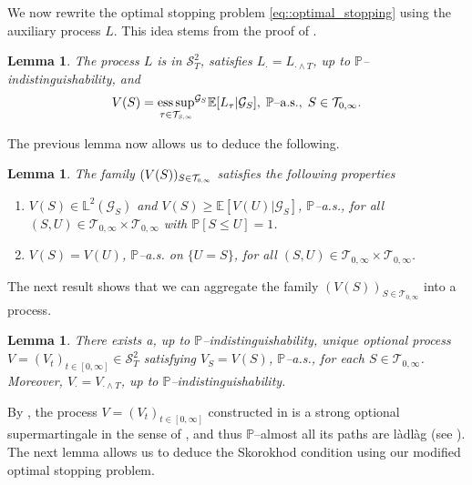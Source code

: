 \documentclass[10pt]{article} %
\newtheorem{lemma}[theorem]{Lemma}
\newcommand\cG{\mathcal G}
\newcommand\cS{\mathcal S}
\newcommand\cT{\mathcal T}
\newcommand{\smalltext}[1]{\text{\fontsize{4}{4}\selectfont$#1$}}
\def \E{\mathbb{E}}
\def \L{\mathbb{L}}
\def \P{\mathbb{P}}
\DeclareMathOperator*{\esssup}{ess\,sup}
\begin{document}
We now rewrite the optimal stopping problem \eqref{eq::optimal_stopping} using the auxiliary process $L$. This idea stems from the proof of \cite[Proposition 6.3.2]{zhang2017backward}.
	
	
\begin{lemma}\label{lem::snell_reformulation}
	The process $L$ is in $\cS^2_T$, satisfies $L_\cdot = L_{\cdot \land T}$, up to $\P$--indistinguishability, and
	\begin{equation*}
		V(S) = {\esssup_{\tau \in \cT_{\smalltext{S}\smalltext{,}\smalltext{\infty}}}}^{\cG_S} \E[ L_\tau | \cG_S ], \; \text{$\P$\rm--a.s.}, \; S \in \cT_{0,\infty}.
	\end{equation*}
\end{lemma}

The previous lemma now allows us to deduce the following.



\begin{lemma}\label{lem::supermartingale_family}
	The family $(V(S))_{S \in \cT_{\smalltext{0}\smalltext{,}\smalltext{\infty}}}$ satisfies the following properties
	\begin{enumerate}
		\item[$(i)$] $V(S) \in \L^2(\cG_S)$ and $V(S) \geq \E[V(U)|\cG_S]$, $\P${\rm--a.s.}, for all $(S,U) \in \cT_{0,\infty} \times \cT_{0,\infty}$ with $\P[S \leq U] = 1$.
		\item[$(ii)$] $V(S) = V(U)$, $\P${\rm--a.s.} on $\{U = S\}$, for all $(S,U) \in \cT_{0,\infty} \times \cT_{0,\infty}$.
	\end{enumerate}
\end{lemma}



The next result shows that we can aggregate the family $(V(S))_{S \in \cT_{0,\infty}}$ into a process.
\begin{lemma}\label{lem::snell_aggregation}
	There exists a, up to $\P$--indistinguishability, unique optional process $V = (V_t)_{t \in [0,\infty]} \in \cS^2_T$ satisfying $V_S = V(S)$, $\P$--{\rm a.s.}, for each $S \in \cT_{0,\infty}$. Moreover, $V_\cdot = V_{\cdot \land T}$, up to $\P$--indistinguishability.
\end{lemma}



By , the process $V = (V_t)_{t \in [0,\infty]}$ constructed in  is a strong optional supermartingale in the sense of \cite[Appendix I]{dellacherie1982probabilities}, and thus $\P$--almost all its paths are l\`adl\`ag (see \cite[Appendix I, Theorem 4]{dellacherie1982probabilities}). 
The next lemma allows us to deduce the Skorokhod condition using our modified optimal stopping problem.
\end{document}
